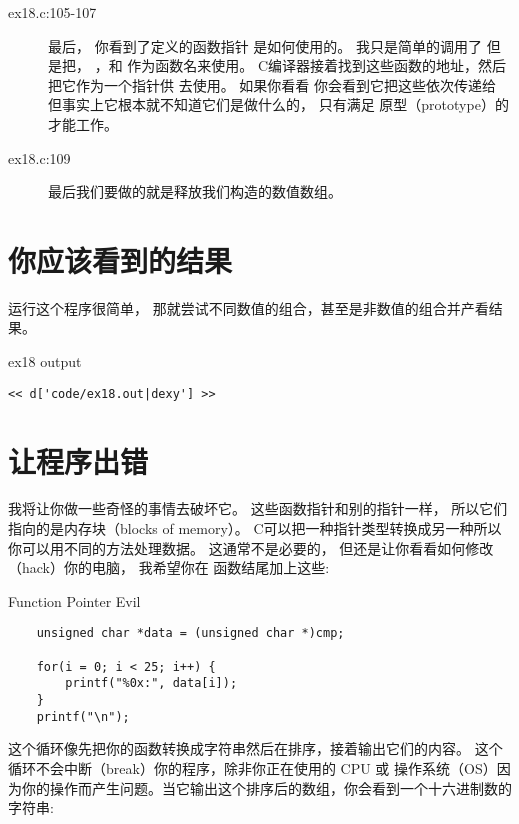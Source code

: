 \begin{description}
\item[ex18.c:105-107] 最后， 你看到了定义的函数指针 是如何使用的。 我只是简单的调用了  但是把， ，和
    作为函数名来使用。 C编译器接着找到这些函数的地址，然后把它作为一个指针供  去使用。 如果你看看 你会看到它把这些依次传递给 但事实上它根本就不知道它们是做什么的， 只有满足 原型（prototype）的才能工作。
\item[ex18.c:109] 最后我们要做的就是释放我们构造的数值数组。
\end{description}


\section{你应该看到的结果}

运行这个程序很简单， 那就尝试不同数值的组合，甚至是非数值的组合并产看结果。

\begin{code}{ex18 output}
\begin{lstlisting}
<< d['code/ex18.out|dexy'] >>
\end{lstlisting}
\end{code}


\section{让程序出错}

我将让你做一些奇怪的事情去破坏它。  这些函数指针和别的指针一样， 所以它们指向的是内存块（blocks of memory）。  C可以把一种指针类型转换成另一种所以你可以用不同的方法处理数据。  这通常不是必要的， 但还是让你看看如何修改（hack）你的电脑， 我希望你在  函数结尾加上这些:

\begin{code}{Function Pointer Evil}
\begin{lstlisting}
    unsigned char *data = (unsigned char *)cmp;

    for(i = 0; i < 25; i++) {
        printf("%0x:", data[i]);
    }
    printf("\n");
\end{lstlisting}
\end{code}

这个循环像先把你的函数转换成字符串然后在排序，接着输出它们的内容。 这个循环不会中断（break）你的程序，除非你正在使用的 CPU 或 操作系统（OS）因为你的操作而产生问题。当它输出这个排序后的数组，你会看到一个十六进制数的字符串:

